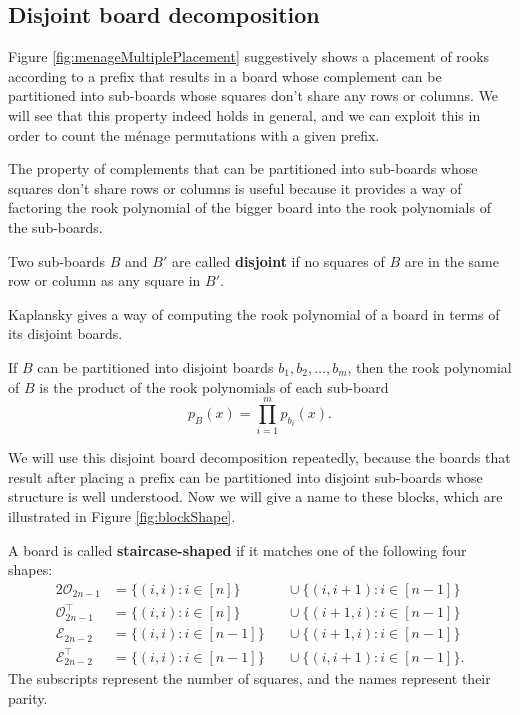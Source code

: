 \subsection{Disjoint board decomposition}
Figure \ref{fig:menageMultiplePlacement}
suggestively shows a placement of rooks according to a prefix that
results in a board whose complement can be partitioned into
sub-boards whose squares don't share any rows or columns.
We will see that this property indeed holds in general,
and we can exploit this in order to count the m\'enage permutations
with a given prefix.



The property of complements that can be partitioned into sub-boards
whose squares don't share rows or columns is useful because it provides
a way of factoring the rook polynomial of the bigger board into the rook
polynomials of the sub-boards.
\begin{definition}
  Two sub-boards $B$ and $B'$ are called \textbf{disjoint} if no squares of $B$ are
  in the same row or column as any square in $B'$.
\end{definition}

Kaplansky gives a way of computing the rook polynomial of a board in terms of
its disjoint boards.
\begin{theorem}
  If $B$ can be partitioned into disjoint boards $b_1, b_2, \dots, b_m$,
  then the rook polynomial of $B$ is the product of the rook polynomials of
  each sub-board \begin{equation}
    p_B(x) = \prod_{i=1}^m p_{b_i}(x).
  \end{equation}
\label{thm:productOfDisjointBoards}
\end{theorem}

We will use this disjoint board decomposition repeatedly, because the boards
that result
after placing a prefix can be partitioned into disjoint sub-boards whose
structure is well understood. Now we will give a name to these blocks,
which are illustrated in Figure \ref{fig:blockShape}.



\begin{definition}
  A board is called \textbf{staircase-shaped} if it matches one of the
  following four shapes:
  \begin{alignat*}{2}
    \mathcal{O}_{2n-1}           &= \{(i,i) : i \in [n]\}    &&\cup\ \{(i,i+1) : i \in [n-1]\} \\
    \mathcal{O}_{2n-1}^\intercal &= \{(i,i) : i \in [n]\}    &&\cup\ \{(i+1,i) : i \in [n-1]\} \\
    \mathcal{E}_{2n-2}           &= \{(i,i) : i \in [n-1]\}\ &&\cup\ \{(i+1,i) : i \in [n-1]\} \\
    \mathcal{E}_{2n-2}^\intercal &= \{(i,i) : i \in [n-1]\}\ &&\cup\ \{(i,i+1) : i \in [n-1]\}.
  \end{alignat*}
  The subscripts represent the number of squares, and the names represent their
  parity.
  \label{def:staircaseShaped}
\end{definition}

